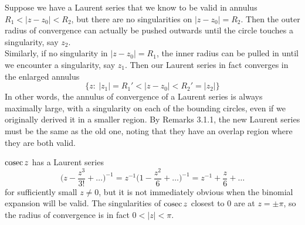 \documentclass[a4paper]{article}
\begin{document}
\begin{remarks}
Suppose we have a Laurent series that we know to be valid in annulus $R_1<|z-z_0|<R_2$, but there are no singularities on $|z-z_0|=R_2$. Then the outer radius of convergence can actually be pushed outwards until the circle touches a singularity, say $z_2$.\\[5pt]
Similarly, if no singularity in $|z-z_0|=R_1$, the inner radius can be pulled in until we encounter a singularity, say $z_1$. Then our Laurent series in fact converges in the enlarged annulus
$$\{z:~|z_1|=R_1'<|z-z_0|<R_2'=|z_2|\}$$
In other words, the annulus of convergence of a Laurent series is always maximally large, with a singularity on each of the bounding circles, even if we originally derived it in a smaller region. By Remarks 3.1.1, the new Laurent series must be the same as the old one, noting that they have an overlap region where they are both valid.
\end{remarks}
\begin{eg}
$\operatorname{cosec} z$ has a Laurent series
$$\bigg(z-\frac{z^3}{3!}+\dots\bigg)^{-1}=z^{-1}\bigg(1-\frac{z^2}{6}+\dots\bigg)^{-1}=z^{-1}+\frac{z}{6}+\dots$$
for sufficiently small $z\neq 0$, but it is not immediately obvious when the binomial expansion will be valid. The singularities of $\operatorname{cosec} z$ closest to 0 are at $z=\pm\pi$, so the radius of convergence is in fact $0<|z|<\pi$.
\end{eg}
\newpage
\end{document}
